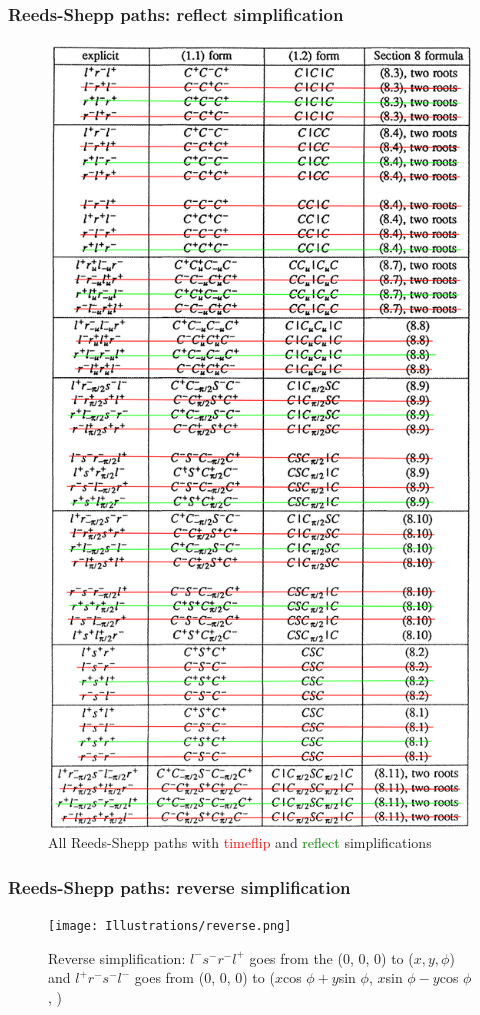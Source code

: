 \documentclass{beamer}
\begin{document}
\begin{frame}

\frametitle{Reeds-Shepp paths: reflect simplification}

\begin{figure}
\centering
  \centering
  \includegraphics[width=0.4\linewidth]{Illustrations/ReedsSheppPossibilitiesNoTitleNoTimeflipNoReflect.png}
  \caption{All Reeds-Shepp paths with \textcolor{red}{timeflip} and \textcolor{green}{reflect} simplifications}
  \label{fig:sub1}
\end{figure}
\end{frame}

\begin{frame}

\frametitle{Reeds-Shepp paths: reverse simplification}

\begin{figure}
\centering
  \centering
  \texttt{[image: Illustrations/reverse.png]}
  \caption{Reverse simplification: $l^-s^-r^-l^+$ goes from the (0, 0, 0) to ($x, y, \phi$) and $l^+r^-s^-l^-$ goes from (0, 0, 0) to ($x$cos $\phi+y$sin $\phi$, $x$sin $\phi-y$cos $\phi$, \phi)}
  \label{fig:sub1}
\end{figure}
\end{frame}
\end{document}
